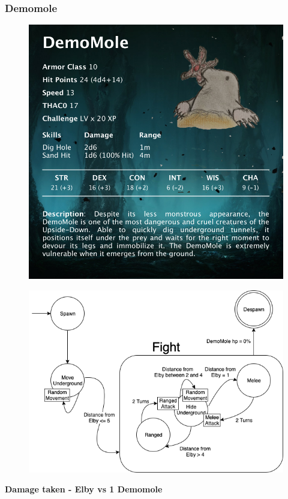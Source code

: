 \subsubsection{Demomole}
\vspace*{0.3cm}
\begin{figure}[H]
	\centering
	\includegraphics[width=0.9\linewidth]{images/visual_stats/demomole.png}
\end{figure}
\newpage
\begin{figure}[H]
	\centering
	\includegraphics[width=0.8\linewidth]{images/graphs/fsa/fsa_demomole.png}
\end{figure}
\vspace*{4mm}
\textbf{Damage taken - Elby vs 1 Demomole}\\
